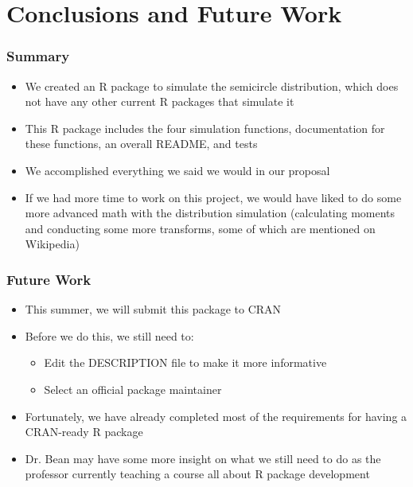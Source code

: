 \documentclass[handout, xcolor=dvipsnames]{beamer}
\begin{document}
\section{Conclusions and Future Work}  

\begin{frame}
	\frametitle{Summary}
        \begin{itemize}
            \item We created an R package to simulate the semicircle distribution, which does not have any other current R packages that simulate it
            \item This R package includes the four simulation functions, documentation for these functions, an overall README, and tests
            \item We accomplished everything we said we would in our proposal
            \item If we had more time to work on this project, we would have liked to do some more advanced math with the distribution simulation (calculating moments and conducting some more transforms, some of which are mentioned on Wikipedia)
        \end{itemize}
\end{frame}


\begin{frame}
	\frametitle{Future Work}
        \begin{itemize}
            \item This summer, we will submit this package to CRAN
            \item Before we do this, we still need to:
            \begin{itemize}
                \item Edit the DESCRIPTION file to make it more informative
                \item Select an official package maintainer
            \end{itemize}
            \item Fortunately, we have already completed most of the requirements for having a CRAN-ready R package
            \item Dr. Bean may have some more insight on what we still need to do as the professor currently teaching a course all about R package development
        \end{itemize}
\end{frame}

\end{document}
